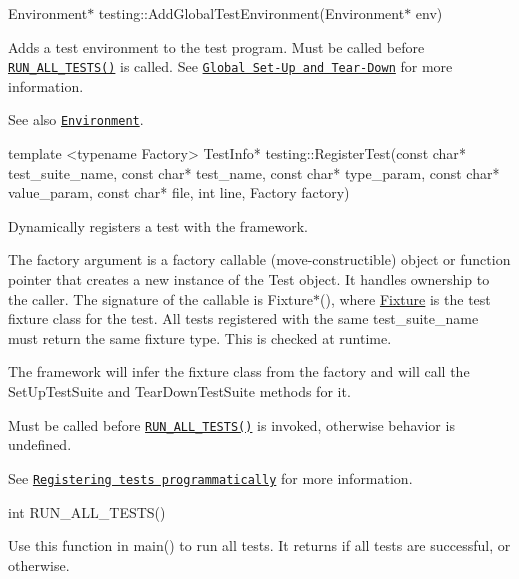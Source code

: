 {\ttfamily Environment$\ast$ testing\+::\+Add\+Global\+Test\+Environment(\+Environment$\ast$ env)}

Adds a test environment to the test program. Must be called before \href{#RUN_ALL_TESTS}{\tt {\ttfamily R\+U\+N\+\_\+\+A\+L\+L\+\_\+\+T\+E\+S\+T\+S()}} is called. See \href{../advanced.md#global-set-up-and-tear-down}{\tt Global Set-\/\+Up and Tear-\/\+Down} for more information.

See also \href{#Environment}{\tt {\ttfamily Environment}}.


\begin{DoxyCode}
\textcolor{keyword}{template} <\textcolor{keyword}{typename} Factory>
TestInfo* testing::RegisterTest(\textcolor{keyword}{const} \textcolor{keywordtype}{char}* test\_suite\_name, \textcolor{keyword}{const} \textcolor{keywordtype}{char}* test\_name,
                                  \textcolor{keyword}{const} \textcolor{keywordtype}{char}* type\_param, \textcolor{keyword}{const} \textcolor{keywordtype}{char}* value\_param,
                                  \textcolor{keyword}{const} \textcolor{keywordtype}{char}* file, \textcolor{keywordtype}{int} line, Factory factory)
\end{DoxyCode}


Dynamically registers a test with the framework.

The {\ttfamily factory} argument is a factory callable (move-\/constructible) object or function pointer that creates a new instance of the {\ttfamily Test} object. It handles ownership to the caller. The signature of the callable is {\ttfamily Fixture$\ast$()}, where {\ttfamily \mbox{\hyperlink{classFixture}{Fixture}}} is the test fixture class for the test. All tests registered with the same {\ttfamily test\+\_\+suite\+\_\+name} must return the same fixture type. This is checked at runtime.

The framework will infer the fixture class from the factory and will call the {\ttfamily Set\+Up\+Test\+Suite} and {\ttfamily Tear\+Down\+Test\+Suite} methods for it.

Must be called before \href{#RUN_ALL_TESTS}{\tt {\ttfamily R\+U\+N\+\_\+\+A\+L\+L\+\_\+\+T\+E\+S\+T\+S()}} is invoked, otherwise behavior is undefined.

See \href{../advanced.md#registering-tests-programmatically}{\tt Registering tests programmatically} for more information.

{\ttfamily int R\+U\+N\+\_\+\+A\+L\+L\+\_\+\+T\+E\+S\+T\+S()}

Use this function in {\ttfamily main()} to run all tests. It returns {} if all tests are successful, or {} otherwise.

